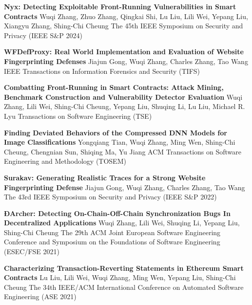 \documentclass[localFont,alternative]{documentMETADATA}
\begin{document}

\begin{scholarship}
	{\textbf{Nyx: Detecting Exploitable Front-Running Vulnerabilities in Smart Contracts}}
	{Wuqi Zhang, Zhuo Zhang, Qingkai Shi, Lu Liu, Lili Wei, Yepang Liu, Xiangyu Zhang, Shing-Chi Cheung}
	\scholarshipentry{}
	{The 45th IEEE Symposium on Security and Privacy (IEEE S\&P 2024)}

	{\textbf{WFDefProxy: Real World Implementation and Evaluation of Website Fingerprinting Defenses}}
	{Jiajun Gong, Wuqi Zhang, Charles Zhang, Tao Wang}
	\scholarshipentry{}
	{IEEE Transactions on Information Forensics and Security (TIFS)}

	{\textbf{Combatting Front-Running in Smart Contracts: Attack Mining, Benchmark Construction and Vulnerability Detector Evaluation}}
	{Wuqi Zhang, Lili Wei, Shing-Chi Cheung, Yepang Liu, Shuqing Li, Lu Liu, Michael R. Lyu}
	\scholarshipentry{}
	{Transactions on Software Engineering (TSE)}

	{\textbf{Finding Deviated Behaviors of the Compressed DNN Models for Image Classifications}}
	{Yongqiang Tian, Wuqi Zhang, Ming Wen, Shing-Chi Cheung, Chengnian Sun, Shiqing Ma, Yu Jiang}
	\scholarshipentry{}
	{ACM Transactions on Software Engineering and Methodology (TOSEM)}

	{\textbf{Surakav: Generating Realistic Traces for a Strong Website Fingerprinting Defense}}
	{Jiajun Gong, Wuqi Zhang, Charles Zhang, Tao Wang}
	\scholarshipentry{}
	{The 43rd IEEE Symposium on Security and Privacy (IEEE S\&P 2022)}

	{\textbf{ÐArcher: Detecting On-Chain-Off-Chain Synchronization Bugs In Decentralized Applications}}
	{Wuqi Zhang, Lili Wei, Shuqing Li, Yepang Liu, Shing-Chi Cheung}
	\scholarshipentry{}
	{The 29th ACM Joint European Software Engineering Conference and Symposium on the Foundations of Software Engineering (ESEC/FSE 2021)}

	{\textbf{Characterizing Transaction-Reverting Statements in Ethereum Smart Contracts}}
	{Lu Liu, Lili Wei, Wuqi Zhang, Ming Wen, Yepang Liu, Shing-Chi Cheung}
	\scholarshipentry{}
	{The 34th IEEE/ACM International Conference on Automated Software Engineering (ASE 2021)}

\end{scholarship}
\end{document}
